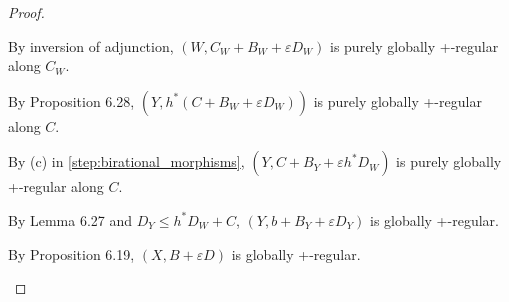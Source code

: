 \begin{proof}
\begin{subproof}
            By inversion of adjunction, \((W,C_W+B_W+\varepsilon D_W)\) is purely globally +-regular along \(C_W\).
            
            By Proposition 6.28, \((Y,h^*(C+B_W+\varepsilon D_W))\) is purely globally +-regular along \(C\).
            
            By (c) in \cref{step:birational_morphisms}, \((Y,C+B_Y+\varepsilon h^*D_W)\) is purely globally +-regular along \(C\).
            
            By Lemma 6.27 and \(D_Y \leq h^*D_W + C\), \((Y,b+B_Y+\varepsilon D_Y)\) is globally +-regular.
            
            By Proposition 6.19, \((X,B+\varepsilon D)\) is globally +-regular.
        \end{subproof}


    \end{proof}